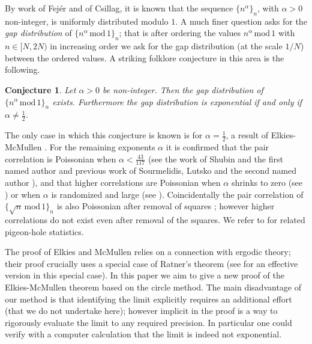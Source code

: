 \documentclass[12pt,reqno]{amsart}
\theoremstyle{plain}
\newtheorem{conjecture}{Conjecture}
\numberwithin{equation}{section}
\numberwithin{figure}{section}
\theoremstyle{plain}
\theoremstyle{definition}
\theoremstyle{remark}
\newcommand{\mmod}{\,\mathrm{mod}\,}
\begin{document}
By work of Fej\'{e}r and of Csillag,
it is known that the sequence $\{n^{\alpha}\}_n$, with $\alpha > 0$ non-integer, is uniformly distributed modulo $1$. 
A much finer question asks for the \textit{gap distribution} of 
$\{ n^{\alpha} \mmod{1}\}_n$; that is after ordering the values 
$n^{\alpha} \mmod{1}$ with $n \in [N, 2N)$ in increasing order we ask for the gap distribution (at the scale $1/N$) between the ordered values. A striking folklore conjecture in this area is the following.
  \begin{conjecture}
    Let $\alpha > 0$ be non-integer. 
    Then the gap distribution of 
    $\{ n^{\alpha} \mmod{1}\}_n$ exists. 
    Furthermore the gap distribution is 
    exponential if and only if $\alpha \neq \tfrac 12$. 
  \end{conjecture}
The only case in which this conjecture is known is for $\alpha = \tfrac 12$, a result of Elkies-McMullen \cite{EM}. For the remaining exponents $\alpha$ it is confirmed that the pair correlation is Poissonian when $\alpha < \tfrac {43}{117}$ 
(see the work
of Shubin and 
the first named author \cite{radziwill2023poissonian}
and previous work of Sourmelidis, Lutsko
and the second named author \cite{A}),
and that higher correlations are Poissonian when $\alpha$ 
shrinks to zero (see \cite{B,C}) or
when $\alpha$ is randomized
and large (see \cite{TY}). 
Coincidentally the pair correlation of 
$\{ \sqrt{n} \mmod 1 \}_n$ is also Poissonian 
after removal of squares \cite{Pair}; 
however higher correlations do not exist 
even after removal of the squares. 
We refer to \cite{Pattison} for related pigeon-hole statistics.

  The proof of Elkies and McMullen relies on a connection with ergodic theory; their proof crucially uses a special case of Ratner's theorem (see \cite{Effective} for an effective version in this special case). In this paper we aim to give a new proof of the Elkies-McMullen theorem based on the circle method.
   The main disadvantage of our method is that identifying the limit explicitly requires an additional effort (that we do not undertake here); however implicit in the proof is a way to rigorously evaluate the limit to any required precision. In particular one could verify with a computer calculation that the limit is indeed not exponential.
\end{document}
